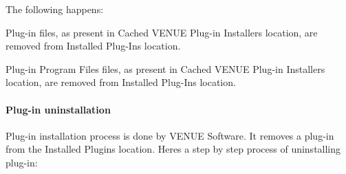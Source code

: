  The following happens\+: 
\begin{DoxyEnumerate}
\item Plug-\/in files, as present in Cached V\+E\+N\+U\+E Plug-\/in Installers location, are removed from Installed Plug-\/\+Ins location.  
\item Plug-\/in Program Files files, as present in Cached V\+E\+N\+U\+E Plug-\/in Installers location, are removed from Installed Plug-\/\+Ins location.  
\end{DoxyEnumerate}

\hypertarget{a00377_subsubsection__aax_venue_guide__system_details__plugin_installation__uninstall}{}\paragraph{Plug-\/in uninstallation}\label{a00377_subsubsection__aax_venue_guide__system_details__plugin_installation__uninstall}
 Plug-\/in installation process is done by V\+E\+N\+U\+E Software. It removes a plug-\/in from the Installed Plugins location. Here\textquotesingle{}s a step by step process of uninstalling plug-\/in\+: 
